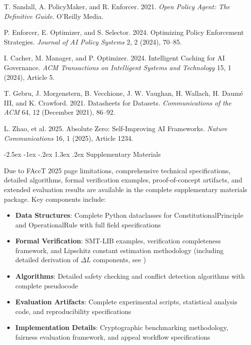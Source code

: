 \documentclass[manuscript,screen,review,anonymous,9pt]{acmart}
\makeatletter
\renewcommand\section{\@startsection{section}{1}{\z@}%
  {-2.5ex \@plus -1ex \@minus -.2ex}%
  {1.3ex \@plus.2ex}%
  {\normalfont\Large\bfseries}}
\makeatother
\begin{document}
\begin{thebibliography}{99}
T. Sandall, A. PolicyMaker, and R. Enforcer. 2021.
\newblock \emph{Open Policy Agent: The Definitive Guide}.
\newblock O'Reilly Media.

P. Enforcer, E. Optimizer, and S. Selector. 2024.
\newblock Optimizing Policy Enforcement Strategies.
\newblock \emph{Journal of AI Policy Systems} 2, 2 (2024), 70--85.

I. Cacher, M. Manager, and P. Optimizer. 2024.
\newblock Intelligent Caching for AI Governance.
\newblock \emph{ACM Transactions on Intelligent Systems and Technology} 15, 1 (2024), Article 5.

T. Gebru, J. Morgenstern, B. Vecchione, J. W. Vaughan, H. Wallach, H. Daumé III, and K. Crawford. 2021.
\newblock Datasheets for Datasets.
\newblock \emph{Communications of the ACM} 64, 12 (December 2021), 86--92.

L. Zhao, et al. 2025.
\newblock Absolute Zero: Self-Improving AI Frameworks.
\newblock \emph{Nature Communications} 16, 1 (2025), Article 1234.

\end{thebibliography}


\appendix

\section{Supplementary Materials}
\label{app:supplementary}

Due to FAccT 2025 page limitations, comprehensive technical specifications, detailed algorithms, formal verification examples, proof-of-concept artifacts, and extended evaluation results are available in the complete supplementary materials package. Key components include:

\begin{itemize}
	\item \textbf{Data Structures}: Complete Python dataclasses for ConstitutionalPrinciple and OperationalRule with full field specifications
	\item \textbf{Formal Verification}: SMT-LIB examples, verification completeness framework, and Lipschitz constant estimation methodology (including detailed derivation of $\Delta L$ components, see )
	\item \textbf{Algorithms}: Detailed safety checking and conflict detection algorithms with complete pseudocode
	\item \textbf{Evaluation Artifacts}: Complete experimental scripts, statistical analysis code, and reproducibility specifications
	\item \textbf{Implementation Details}: Cryptographic benchmarking methodology, fairness evaluation framework, and appeal workflow specifications
\end{itemize}
\end{document}

